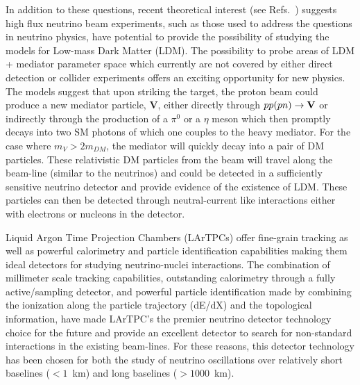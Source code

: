 In addition to these questions, recent theoretical interest (see Refs.~\cite{if:ldm-1, if:ldm-2,if:ldm-3, if:ldm-4}) suggests high flux neutrino beam experiments, such as those used to address the questions in neutrino physics, have potential to provide the possibility of studying the models for Low-mass Dark Matter (LDM). The possibility to probe areas of LDM + mediator parameter space which currently are not covered by either direct detection or collider experiments offers an exciting opportunity for new physics. The models suggest that upon striking the target, the proton beam could produce a new mediator particle, $\textbf{V}$, either directly through $pp(pn)\rightarrow \bf {V}$ or indirectly through the production of a $\pi^{0}$ or a $\eta$ meson which then promptly decays into two SM photons of which one couples to the heavy mediator. For the case where $m_{V} > 2m_{DM}$, the mediator will quickly decay into a pair of DM particles.  These relativistic DM particles from the beam will travel along the beam-line (similar to the neutrinos) and could be detected in a sufficiently sensitive neutrino detector and provide evidence of the existence of LDM. These particles can then be detected through neutral-current like interactions either with electrons or nucleons in the detector.

Liquid Argon Time Projection Chambers (LArTPCs) offer fine-grain tracking as well as powerful calorimetry and particle identification capabilities making them ideal detectors for studying neutrino-nuclei interactions. The combination of millimeter scale tracking capabilities, outstanding calorimetry through a fully active/sampling detector, and powerful particle identification made by combining the ionization along the particle trajectory (dE/dX) and the topological information, have made LArTPC's the premier neutrino detector technology choice for the future and provide an excellent detector to search for non-standard interactions in the existing beam-lines. For these reasons, this detector technology has been chosen for both the study of neutrino oscillations over relatively short baselines ($<1$~km) and long baselines ($>1000$~km). 

%



